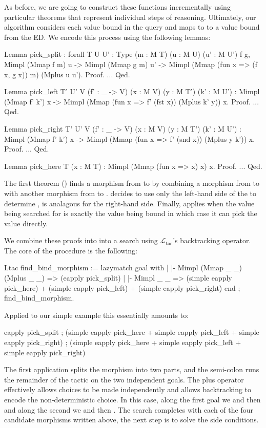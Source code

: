 \documentclass[preprint]{sigplanconf}
\newcommand{\ltac}[0]{\ensuremath{\mathcal{L}_{\mathrm{tac}}}}
\begin{document}
As before, we are going to construct these functions incrementally using particular theorems that represent individual steps of reasoning.
Ultimately, our algorithm considers each value bound in the query and maps to to a value bound from the ED.
We encode this process using the following lemmas:
\begin{coq}
Lemma pick_split
: forall {T U U' : Type} (m : M T) (u : M U) (u' : M U') f g,
  Mimpl (Mmap f m) u ->
  Mimpl (Mmap g m) u' ->
  Mimpl (Mmap (fun x => (f x, g x)) m) (Mplus u u').
Proof. ... Qed.

Lemma pick_left {T' U' V} (f' : _ -> V) (x : M V) (y : M T') (k' : M U')
: Mimpl (Mmap f' k') x ->
  Mimpl (Mmap (fun x => f' (fst x)) (Mplus k' y)) x.
Proof. ... Qed.

Lemma pick_right {T' U' V} (f' : _ -> V) (x : M V) (y : M T') (k' : M U')
: Mimpl (Mmap f' k') x ->
  Mimpl (Mmap (fun x => f' (snd x)) (Mplus y k')) x.
Proof. ... Qed.

Lemma pick_here {T} (x : M T)
: Mimpl (Mmap (fun x => x) x) x.
Proof. ... Qed.
\end{coq}
The first theorem () finds a morphism from  to  by combining a morphism from  to  with another morphism from  to .
 decides to use only the left-hand side of the  to determine ,  is analagous for the right-hand side.
Finally,  applies when the value being searched for is exactly the value being bound in which case it can pick the value directly.

We combine these proofs into into a search using \ltac's backtracking \coqe{+} operator.
The core of the procedure is the following:
\begin{coq}
Ltac find_bind_morphism :=
  lazymatch goal with
  | |- Mimpl (Mmap _ _) (Mplus _ _) =>
      (eapply pick_split)
  | |- Mimpl _ _  =>
      (simple eapply pick_here)
    + (simple eapply pick_left)
    + (simple eapply pick_right)
  end ; find_bind_morphism.
\end{coq}
Applied to our simple example this essentially amounts to:
\begin{coq}
eapply pick_split ;
  (simple eapply pick_here + simple eapply pick_left + simple eapply pick_right) ;
  (simple eapply pick_here + simple eapply pick_left + simple eapply pick_right)
\end{coq}
The first application splits the morphism into two parts, and the semi-colon runs the remainder of the tactic on the two independent goals.
The plus operator effectively allows choices to be made independently and allows backtracking to encode the non-deterministic choice.
In this case, along the first goal we  and then  and along the second we  and then .
The search completes with each of the four candidate morphisms written above, the next step is to solve the side conditions.
\end{document}
